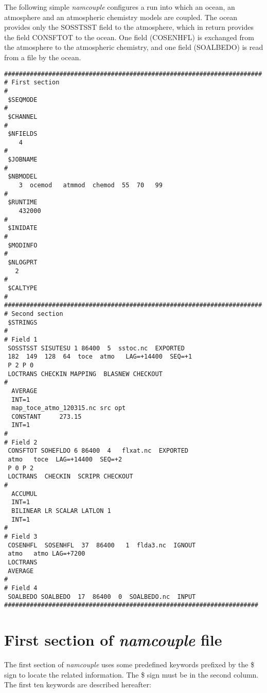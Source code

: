 The following simple {\it namcouple} configures a run into which an
ocean, an atmosphere and an atmospheric chemistry models are
coupled. The ocean provides only the SOSSTSST field to the atmosphere,
which in return provides the field CONSFTOT to the ocean. One field
(COSENHFL) is exchanged from the atmosphere to the
atmospheric chemistry, and one field (SOALBEDO) is read from a file by
the ocean.

\begin{verbatim}
######################################################################
# First section
#
 $SEQMODE
#
 $CHANNEL
#
 $NFIELDS
    4  
#
 $JOBNAME
#
 $NBMODEL
    3  ocemod   atmmod  chemod  55  70   99 
#
 $RUNTIME
    432000
#
 $INIDATE
#
 $MODINFO
#
 $NLOGPRT
   2
#
 $CALTYPE
#
######################################################################
# Second section 
 $STRINGS
#
# Field 1
 SOSSTSST SISUTESU 1 86400  5  sstoc.nc  EXPORTED
 182  149  128  64  toce  atmo   LAG=+14400  SEQ=+1
 P 2 P 0
 LOCTRANS CHECKIN MAPPING  BLASNEW CHECKOUT 
#
  AVERAGE 
  INT=1
  map_toce_atmo_120315.nc src opt
  CONSTANT     273.15 
  INT=1
#
# Field 2
 CONSFTOT SOHEFLDO 6 86400  4   flxat.nc  EXPORTED
 atmo   toce  LAG=+14400  SEQ=+2
 P 0 P 2
 LOCTRANS  CHECKIN  SCRIPR CHECKOUT
#
  ACCUMUL 
  INT=1
  BILINEAR LR SCALAR LATLON 1
  INT=1
#
# Field 3
 COSENHFL  SOSENHFL  37  86400   1  flda3.nc  IGNOUT 
 atmo   atmo LAG=+7200 
 LOCTRANS
 AVERAGE
#
# Field 4
 SOALBEDO SOALBEDO  17  86400  0  SOALBEDO.nc  INPUT
#####################################################################
\end{verbatim}


\section{ First section of {\it namcouple} file}
\label{subsec_namcouplefirst}

The first section of {\it namcouple } uses some predefined keywords
prefixed by the \$ sign to locate the related information. The
\$ sign must be in the second column. The first ten keywords
are described hereafter:

